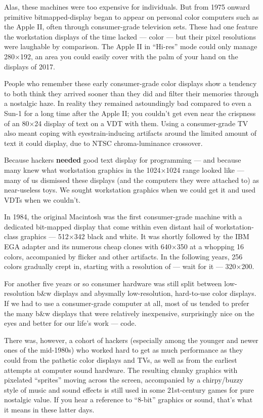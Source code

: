 \documentclass[12pt,letterpaper]{article}
\newcommand{\strong}[1]{\textbf{#1}}
\newcommand{\mc}{\small}
\newcommand{\acro}[1]{{\mc #1\spacefactor1000}}
\begin{document}
Alas, these machines were too expensive for individuals. But from 1975 onward
primitive bitmapped-display began to appear on personal color computers such as
the Apple II, often through consumer-grade television sets. These had one
feature the workstation displays of the time lacked --- color --- but their pixel
resolutions were laughable by comparison. The Apple II in ``Hi-res'' mode could
only manage 280$\times$192, an area you could easily cover with the palm of your hand
on the displays of 2017.

People who remember these early consumer-grade color displays show a tendency
to both think they arrived sooner than they did and filter their memories
through a nostalgic haze. In reality they remained astoundingly bad compared to
even a Sun-1 for a long time after the Apple II; you couldn't get even near the
crispness of an 80$\times$24 display of text on a \acro{VDT} with them. Using a
consumer-grade TV also meant coping with eyestrain-inducing artifacts around
the limited amount of text it could display, due to \acro{NTSC} chroma-luminance
crossover.

Because hackers \strong{needed} good text display for programming --- and because many
knew what workstation graphics in the 1024$\times$1024 range looked like --- many of us
dismissed these displays (and the computers they were attached to) as
near-useless toys. We sought workstation graphics when we could get it and used
\acro{VDT}s when we couldn't.

In 1984, the original Macintosh was the first consumer-grade machine with a
dedicated bit-mapped display that come within even distant hail of
workstation-class graphics --- 512$\times$342 black and white. It was shortly followed
by the \acro{IBM EGA} adapter and its numerous cheap clones with 640$\times$350 at a whopping
16 colors, accompanied by flicker and other artifacts. In the following years,
256 colors gradually crept in, starting with a resolution of --- wait for it --- 
320$\times$200.

For another five years or so consumer hardware was still split between
low-resolution b\&w displays and abysmally low-resolution, hard-to-use color
displays. If we had to use a consumer-grade computer at all, most of us tended
to prefer the many b\&w displays that were relatively inexpensive, surprisingly
nice on the eyes and better for our life's work --- code.

There was, however, a cohort of hackers (especially among the younger and newer
ones of the mid-1980s) who worked hard to get as much performance as they could
from the pathetic color displays and \acro{TV}s, as well as from the earliest attempts
at computer sound hardware. The resulting chunky graphics with pixelated
``sprites'' moving across the screen, accompanied by a chirpy/buzzy style of
music and sound effects is still used in some 21st-century games for pure
nostalgic value. If you hear a reference to ``8-bit'' graphics or sound, that's
what it means in these latter days.
\end{document}
